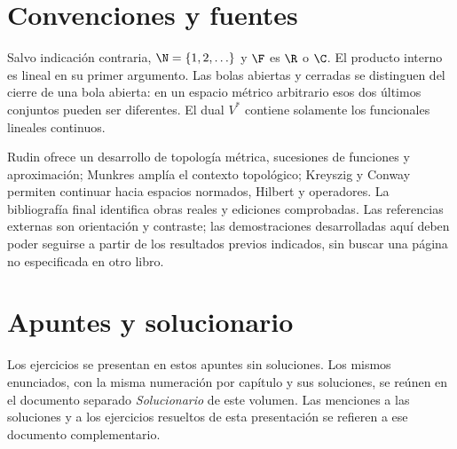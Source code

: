 \section*{Convenciones y fuentes}
Salvo indicación contraria, $\N=\{1,2,\ldots\}$ y $\F$ es $\R$ o $\C$. El producto interno es lineal en su primer argumento. Las bolas abiertas y cerradas se distinguen del cierre de una bola abierta: en un espacio métrico arbitrario esos dos últimos conjuntos pueden ser diferentes. El dual $V^*$ contiene solamente los funcionales lineales continuos.

Rudin \cite{rudin1976} ofrece un desarrollo de topología métrica, sucesiones de funciones y aproximación; Munkres \cite{munkres2000} amplía el contexto topológico; Kreyszig \cite{kreyszig1978} y Conway \cite{conway1990} permiten continuar hacia espacios normados, Hilbert y operadores. La bibliografía final identifica obras reales y ediciones comprobadas. Las referencias externas son orientación y contraste; las demostraciones desarrolladas aquí deben poder seguirse a partir de los resultados previos indicados, sin buscar una página no especificada en otro libro.
\section*{Apuntes y solucionario}
Los ejercicios se presentan en estos apuntes sin soluciones. Los mismos
enunciados, con la misma numeración por capítulo y sus soluciones, se reúnen
en el documento separado \emph{Solucionario} de este volumen. Las menciones
a las soluciones y a los ejercicios resueltos de esta presentación se refieren
a ese documento complementario.

